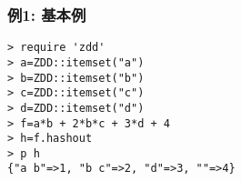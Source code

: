 \subsubsection*{例1: 基本例}



\begin{Verbatim}[baselinestretch=0.7,frame=single]
> require 'zdd'
> a=ZDD::itemset("a")
> b=ZDD::itemset("b")
> c=ZDD::itemset("c")
> d=ZDD::itemset("d")
> f=a*b + 2*b*c + 3*d + 4
> h=f.hashout
> p h
{"a b"=>1, "b c"=>2, "d"=>3, ""=>4}
\end{Verbatim}
